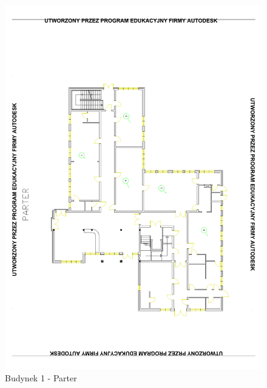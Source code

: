 \begin{figure}[H]
  \begin{center}
    \includegraphics[width=\textwidth]{img/b1-0.pdf}
    \caption{Budynek 1 - Parter}
  \end{center}
\end{figure}

